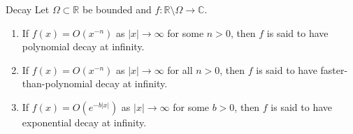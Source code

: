 \documentclass{beamer}
\begin{document}
\begin{frame}
\begin{block}{Decay}
Let $\Omega \subset \mathbb{R}$ be bounded and $f : \mathbb{R}\setminus \Omega
\rightarrow \mathbb{C}$.
\begin{enumerate}

\item  If $ f (x) = O(x^{-n})$ as $|x|\rightarrow\infty$  for some $n > 0$, then $f$ is said to have polynomial decay at infinity.
\item  If $ f (x) = O(x^{-n})$ as $|x|\rightarrow\infty$ for all $n > 0$, then $f$ is said to have faster-than-polynomial decay at infinity.
\item  If $ f (x) = O(e^{-b|x|})$ as $|x|\rightarrow\infty$ for some $b > 0$, then $f$ is said to have exponential decay at infinity.
\end{enumerate}
\end{block}
\end{frame}
\end{document}

